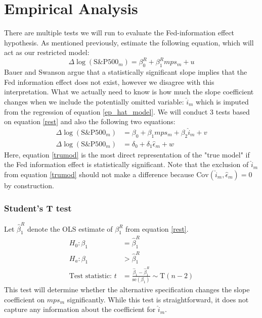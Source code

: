 \documentclass[a4paper,man,floatsintext,natbib]{apa6}
\begin{document}
	\section{Empirical Analysis}
	There are multiple tests we will run to evaluate the Fed-information effect hypothesis. As mentioned previously, \cite{Bauer2020} estimate the following equation, which will act as our restricted model:
	\[
	\Delta \log{(\text{S\&P500}_m)} = \beta^R_0 + \beta^R_1 mps_m + u \tag{5} \label{rest}
	\]
	Bauer and Swanson argue that a statistically significant slope implies that the Fed information effect does not exist, however we disagree with this interpretation. What we actually need to know is how much the slope coefficient changes when we include the potentially omitted variable: \(\hat{i}_m\) which is imputed from the regression of equation \ref{ep_hat_model}. We will conduct 3 tests based on equation \ref{rest} and also the following two equations:
	\begin{align*}
		\Delta \log{(\text{S\&P500}_m)} &= \beta_0 + \beta_1 mps_m + \beta_2 \hat{i}_m + v \tag{6} \label{unrest}\\
		\Delta \log{(\text{S\&P500}_m)} &= \delta_0 + \delta_1 \hat{\epsilon}_m + w \tag{7} \label{trumod}
	\end{align*}
	Here, equation \ref{trumod} is the most direct representation of the "true model" if the Fed information effect is statistically significant. Note that the exclusion of \(\hat{i}_m\) from equation \ref{trumod} should not make a difference because \(\mathrm{Cov}(\hat{i}_m, \hat{\epsilon}_m) = 0\) by construction.
	
	\subsubsection{Student's T test} Let \(\hat{\beta}_1^R\) denote the OLS estimate of \(\beta^R_1\) from equation \ref{rest}.
	\begin{align*}
		H_0: \beta_1 &= \hat{\beta}_1^R \\
		H_a: \beta_1 &> \hat{\beta}_1^R \\
		\text{Test statistic: } t &= \frac{\hat{\beta}_1 -\hat{\beta}_1^R}{\mathrm{se}(\beta_1)} \sim {\mathrm{T}}(n-2) 
	\end{align*}
	This test will determine whether the alternative specification changes the slope coefficient on \(mps_m\) significantly. While this test is straightforward, it does not capture any information about the coefficient for \(\hat{i}_m\).
\end{document}
